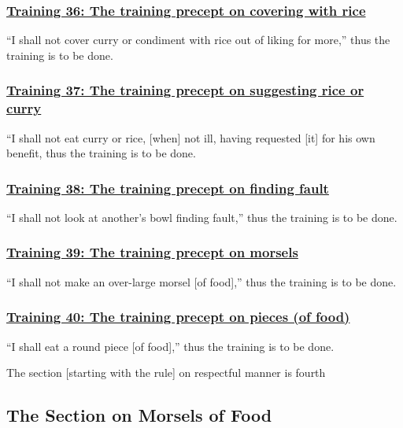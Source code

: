 \subsubsection*{\hyperref[sekh36]{Training 36: The training precept on covering with rice}}
\label{training36}
``I shall not cover curry or condiment with rice out of liking for more,'' thus the training is to be done.

\subsubsection*{\hyperref[sekh37]{Training 37: The training precept on suggesting rice or curry}}
\label{training37}
``I shall not eat curry or rice, [when] not ill, having requested [it] for his own benefit, thus the training is to be done.

\subsubsection*{\hyperref[sekh38]{Training 38: The training precept on finding fault}}
\label{training38}
``I shall not look at another's bowl finding fault,'' thus the training is to be done.

\subsubsection*{\hyperref[sekh39]{Training 39: The training precept on morsels}}
\label{training39}
``I shall not make an over-large morsel [of food],'' thus the training is to be done.

\subsubsection*{\hyperref[sekh40]{Training 40: The training precept on pieces (of food)}}
\label{training40}
``I shall eat a round piece [of food],'' thus the training is to be done.

\begin{center}
  The section [starting with the rule] on respectful manner is fourth
\end{center}

\setsubsecheadstyle{\subsectionFmt}
\subsection{The Section on Morsels of Food}
\vspace{0.2cm}

